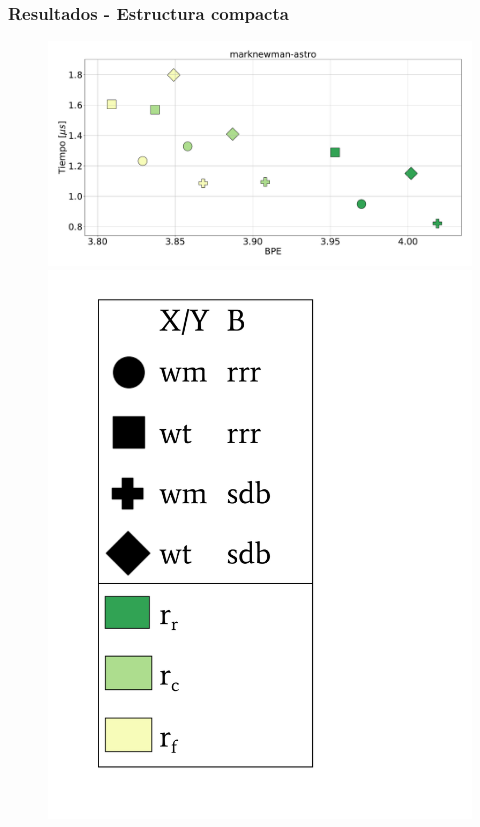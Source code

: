 \begin{frame}
\frametitle{Resultados - Estructura compacta}

\begin{figure}
	\centering
	
    	\begin{minipage}{1\textwidth}
    		\centering
    		\begin{minipage}{0.8\textwidth}
    			\centering
    			\includegraphics[width=1\linewidth]{../img/sdsl/secuencialBig/marknewman-astro.pdf}
    		\end{minipage}
    		\begin{minipage}{0.15\textwidth}
    			\centering
    			\includegraphics[scale=.15, clip, trim=70 0 0 0]{../img/sdsl/label.pdf}
    		\end{minipage}	
    	\end{minipage}


\end{figure}
\end{frame}
